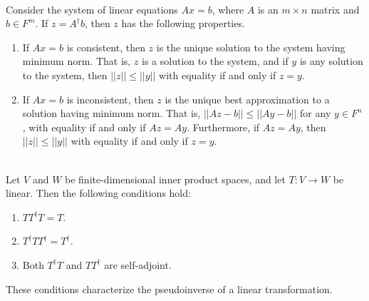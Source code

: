 \begin{theorem}
	\hfill\\
	Consider the system of linear equations $Ax = b$, where $A$ is an $m \times n$ matrix and $b \in F^m$. If $z = A^\dagger b$, then $z$ has the following properties.

	\begin{enumerate}
		\item If $Ax = b$ is consistent, then $z$ is the unique solution to the system having minimum norm. That is, $z$ is a solution to the system, and if $y$ is any solution to the system, then $||z|| \leq ||y||$ with equality if and only if $z = y$.
		\item If $Ax = b$ is inconsistent, then $z$ is the unique best approximation to a solution having minimum norm. That is, $||Az - b|| \leq ||Ay - b||$ for any $y \in F^n$, with equality if and only if $Az = Ay$. Furthermore, if $Az = Ay$, then $||z|| \leq ||y||$ with equality if and only if $z = y$.
	\end{enumerate}
\end{theorem}

\begin{lemma}
	\hfill\\
	Let $V$ and $W$ be finite-dimensional inner product spaces, and let $T: V \to W$ be linear. Then the following conditions hold:

	\begin{enumerate}
		\item $TT^\dagger T = T$.
		\item $T^\dagger TT^\dagger = T^\dagger$.
		\item Both $T^\dagger T$ and $TT^\dagger$ are self-adjoint.
	\end{enumerate}

	These conditions characterize the pseudoinverse of a linear transformation.
\end{lemma}
